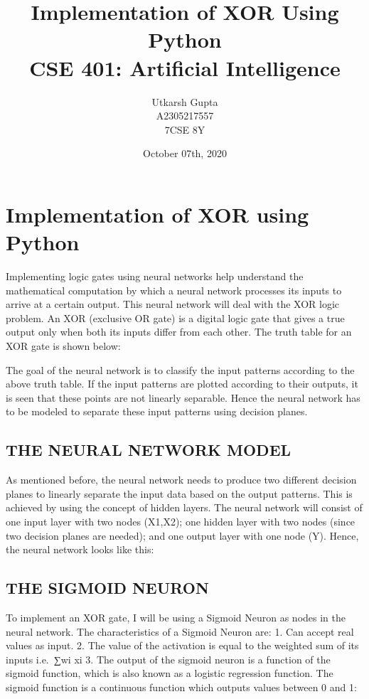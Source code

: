 \documentclass[11pt]{article}
\title{%
    Implementation of XOR Using Python \\
    \large CSE 401: Artificial Intelligence }
\author{%
      Utkarsh Gupta \\
      \small A2305217557 \\
      \small 7CSE 8Y}
\date{October 07th, 2020}
\begin{document}
    
    \maketitle
    
    \hypertarget{lab10-implementation-of-xor-using-python}{%
\section{Implementation of XOR using Python}\label{lab10-implementation-of-xor-using-python}}

    Implementing logic gates using neural networks help understand the
mathematical computation by which a neural network processes its inputs
to arrive at a certain output. This neural network will deal with the
XOR logic problem. An XOR (exclusive OR gate) is a digital logic gate
that gives a true output only when both its inputs differ from each
other. The truth table for an XOR gate is shown below:

    The goal of the neural network is to classify the input patterns
according to the above truth table. If the input patterns are plotted
according to their outputs, it is seen that these points are not
linearly separable. Hence the neural network has to be modeled to
separate these input patterns using decision planes.

    \hypertarget{the-neural-network-model}{%
\subsection{THE NEURAL NETWORK MODEL}\label{the-neural-network-model}}

    As mentioned before, the neural network needs to produce two different
decision planes to linearly separate the input data based on the output
patterns. This is achieved by using the concept of hidden layers. The
neural network will consist of one input layer with two nodes (X1,X2);
one hidden layer with two nodes (since two decision planes are needed);
and one output layer with one node (Y). Hence, the neural network looks
like this:

    \hypertarget{the-sigmoid-neuron}{%
\subsection{THE SIGMOID NEURON}\label{the-sigmoid-neuron}}

    To implement an XOR gate, I will be using a Sigmoid Neuron as nodes in
the neural network. The characteristics of a Sigmoid Neuron are: 1. Can
accept real values as input. 2. The value of the activation is equal to
the weighted sum of its inputs i.e.~∑wi xi 3. The output of the sigmoid
neuron is a function of the sigmoid function, which is also known as a
logistic regression function. The sigmoid function is a continuous
function which outputs values between 0 and 1:
\end{document}
